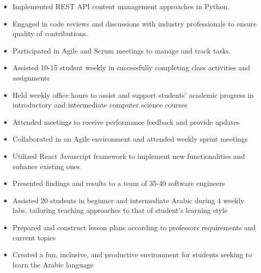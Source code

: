 \begin{itemize}
    \item Implemented REST API content management approaches in Python.
    \item Engaged in code reviews and discussions with industry professionals to
          ensure quality of contributions.
    \item Participated in Agile and Scrum meetings to manage and track tasks.
\end{itemize}
\begin{itemize}
    \item Assisted 10-15  student weekly in successfully completing class
          activities and \\ assignments
    \item Held weekly office hours to assist and support students' academic
          progress in introductory and intermediate computer science courses
    \item Attended meetings to receive performance feedback and provide updates
\end{itemize}
\begin{itemize}
    \item Collaborated in an Agile environment and attended weekly sprint meetings
    \item Utilized React Javascript framework to implement new functionalities
          and \\ enhance existing ones
    \item Presented findings and results to a team of 35-40 software engineers
\end{itemize}
\begin{itemize}
    \item Assisted 20 students in beginner and intermediate Arabic during 4 weekly
          labs, tailoring teaching approaches to that of student’s learning style
    \item Prepared and construct lesson plans according to professors requirements and current topics
    \item Created a fun, inclusive, and productive environment for students seeking to learn the Arabic language
\end{itemize}
